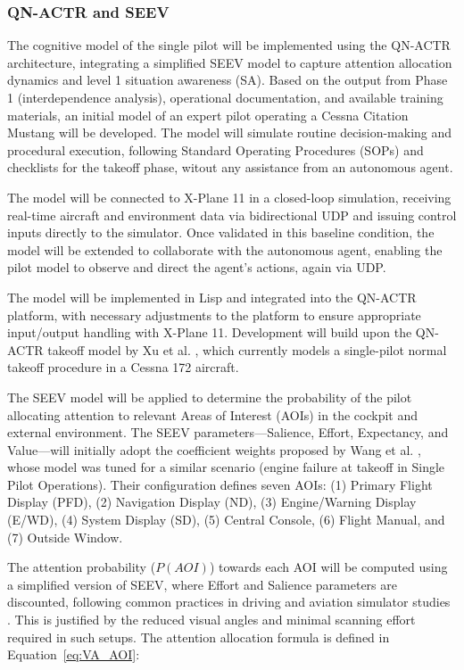 \documentclass[12pt,a4paper]{article} %
\begin{document}
	\subsubsection{QN-ACTR and SEEV}
	The cognitive model of the single pilot will be implemented using the QN-ACTR architecture, integrating a simplified SEEV model to capture attention allocation dynamics and level 1 situation awareness (SA). Based on the output from Phase 1 (interdependence analysis), operational documentation, and available training materials, an initial model of an expert pilot operating a Cessna Citation Mustang will be developed. The model will simulate routine decision-making and procedural execution, following Standard Operating Procedures (SOPs) and checklists for the takeoff phase, witout any assistance from an autonomous agent.

	The model will be connected to X-Plane 11 in a closed-loop simulation, receiving real-time aircraft and environment data via bidirectional UDP and issuing control inputs directly to the simulator. Once validated in this baseline condition, the model will be extended to collaborate with the autonomous agent, enabling the pilot model to observe and direct the agent's actions, again via UDP.
	
	The model will be implemented in Lisp and integrated into the QN-ACTR platform, with necessary adjustments to the platform to ensure appropriate input/output handling with X-Plane 11. Development will build upon the QN-ACTR takeoff model by Xu et al. \parencite{xu_modeling_2021}, which currently models a single-pilot normal takeoff procedure in a Cessna 172 aircraft.
	
	The SEEV model will be applied to determine the probability of the pilot allocating attention to relevant Areas of Interest (AOIs) in the cockpit and external environment. The SEEV parameters—Salience, Effort, Expectancy, and Value—will initially adopt the coefficient weights proposed by Wang et al. \parencite{wang_real-time_2024}, whose model was tuned for a similar scenario (engine failure at takeoff in Single Pilot Operations). Their configuration defines seven AOIs: (1) Primary Flight Display (PFD), (2) Navigation Display (ND), (3) Engine/Warning Display (E/WD), (4) System Display (SD), (5) Central Console, (6) Flight Manual, and (7) Outside Window.
	
	The attention probability ($P(AOI)$) towards each AOI will be computed using a simplified version of SEEV, where Effort and Salience parameters are discounted, following common practices in driving and aviation simulator studies \parencite{}. This is justified by the reduced visual angles and minimal scanning effort required in such setups. The attention allocation formula is defined in Equation~\ref{eq:VA_AOI}:
	
\end{document}
